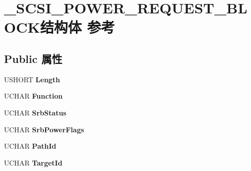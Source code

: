 \hypertarget{struct___s_c_s_i___p_o_w_e_r___r_e_q_u_e_s_t___b_l_o_c_k}{}\section{\+\_\+\+S\+C\+S\+I\+\_\+\+P\+O\+W\+E\+R\+\_\+\+R\+E\+Q\+U\+E\+S\+T\+\_\+\+B\+L\+O\+C\+K结构体 参考}
\label{struct___s_c_s_i___p_o_w_e_r___r_e_q_u_e_s_t___b_l_o_c_k}
\subsection*{Public 属性}
\begin{DoxyCompactItemize}
\item 
\mbox{\label{struct___s_c_s_i___p_o_w_e_r___r_e_q_u_e_s_t___b_l_o_c_k_aa70e025a6161fa11415c39df85814584}} 
U\+S\+H\+O\+RT {\bfseries Length}
\item 
\mbox{\label{struct___s_c_s_i___p_o_w_e_r___r_e_q_u_e_s_t___b_l_o_c_k_a68b7436b166790d9a7fb634cda54b288}} 
U\+C\+H\+AR {\bfseries Function}
\item 
\mbox{\label{struct___s_c_s_i___p_o_w_e_r___r_e_q_u_e_s_t___b_l_o_c_k_ab7c5589923fcde2e4f59f24a3a2287c9}} 
U\+C\+H\+AR {\bfseries Srb\+Status}
\item 
\mbox{\label{struct___s_c_s_i___p_o_w_e_r___r_e_q_u_e_s_t___b_l_o_c_k_a58aa94ee6121f20e9981cb953232d07a}} 
U\+C\+H\+AR {\bfseries Srb\+Power\+Flags}
\item 
\mbox{\label{struct___s_c_s_i___p_o_w_e_r___r_e_q_u_e_s_t___b_l_o_c_k_a813b69fcbfc9a3bfb347fc0207304d30}} 
U\+C\+H\+AR {\bfseries Path\+Id}
\item 
\mbox{\label{struct___s_c_s_i___p_o_w_e_r___r_e_q_u_e_s_t___b_l_o_c_k_ac64793b537bf8b0d457b0aa587297fea}} 
U\+C\+H\+AR {\bfseries Target\+Id}

\end{DoxyCompactItemize}
